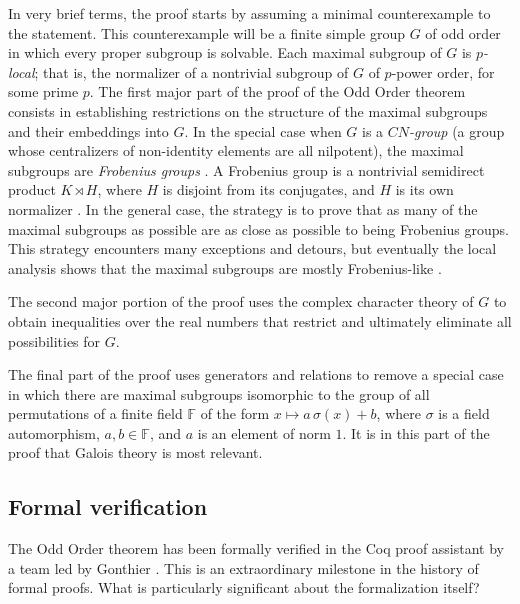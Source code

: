 \documentclass[brochure,english,12pt]{bourbaki}
\theoremstyle{plain}
\def\ring#1{{\mathbb{#1}}}
\begin{document}
In very brief terms, the proof starts by assuming a minimal
counterexample to the statement.  This counterexample will be a finite
simple group $G$ of odd order in which every proper subgroup is
solvable.  Each maximal subgroup of $G$ is {\it $p$-local}; that is,
the normalizer of a nontrivial subgroup of $G$ of $p$-power order, for
some prime $p$.  The first major part of the proof of the Odd Order
theorem consists in establishing restrictions on the structure of the
maximal subgroups and their embeddings into $G$.  In the special case
when $G$ is a {\it $CN$-group} (a group whose centralizers of
non-identity elements are all nilpotent), the maximal subgroups are
{\it Frobenius groups} \cite{FHT}.  A Frobenius group is a nontrivial
semidirect product $K\rtimes H$, where $H$ is disjoint from its
conjugates, and $H$ is its own normalizer
\cite[Th. 7.7]{gorenstein2007finite}.  In the general case, the
strategy is to prove that as many of the maximal subgroups as possible
are as close as possible to being Frobenius groups.  This strategy
encounters many exceptions and detours, but eventually the local
analysis shows that the maximal subgroups are mostly
Frobenius-like \cite[Sec. 16]{bender1994local}.


The second major portion of the proof uses the complex character
theory of $G$ to obtain inequalities over the real numbers that
restrict and ultimately eliminate all possibilities for $G$.

The final part of the proof uses generators and relations to remove a
special case in which there are maximal subgroups isomorphic to the
group of all permutations of a finite field $\ring{F}$ of the form $x
\mapsto a\, \sigma (x) + b$, where $\sigma$ is a field automorphism,
$a,b\in\ring{F}$, and $a$ is an element of norm $1$. It is in this
part of the proof that Galois theory is most relevant.

\subsection{Formal verification}


The Odd Order theorem has been formally verified in the Coq proof
assistant by a team led by Gonthier  \cite{gonthier2013machine}.
This is an extraordinary milestone in the history of formal proofs.
What is particularly significant about the formalization itself?
\end{document}
